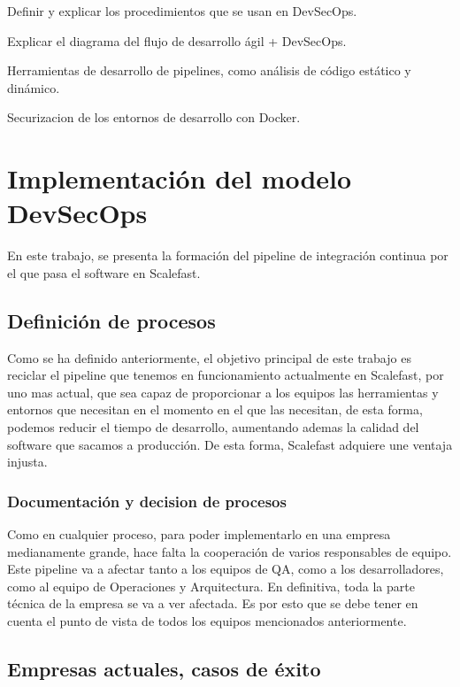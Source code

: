 \documentclass[12pt]{report} %
\begin{document}
Definir y explicar los procedimientos que se usan en DevSecOps.

Explicar el diagrama del flujo de desarrollo ágil + DevSecOps.

Herramientas de desarrollo de pipelines, como análisis de código estático y dinámico.

Securizacion de los entornos de desarrollo con Docker.


\chapter{Implementación del modelo DevSecOps}

En este trabajo, se presenta la formación del pipeline de integración continua por el que pasa el software en Scalefast.

\section{Definición de procesos}

Como se ha definido anteriormente, el objetivo principal de este trabajo es reciclar el pipeline que tenemos en funcionamiento actualmente en Scalefast, por uno mas actual, que sea capaz de proporcionar a los equipos las herramientas y entornos que necesitan en el momento en el que las necesitan, de esta forma, podemos reducir el tiempo de desarrollo, aumentando ademas la calidad del software que sacamos a producción.
De esta forma, Scalefast adquiere une ventaja injusta.

\subsection{Documentación y decision de procesos}

Como en cualquier proceso, para poder implementarlo en una empresa medianamente grande, hace falta la cooperación de varios responsables de equipo.
Este pipeline va a afectar tanto a los equipos de QA, como a los desarrolladores, como al equipo de Operaciones y Arquitectura.
En definitiva, toda la parte técnica de la empresa se va a ver afectada.
Es por esto que se debe tener en cuenta el punto de vista de todos los equipos mencionados anteriormente.

\section{Empresas actuales, casos de éxito}
\end{document}
